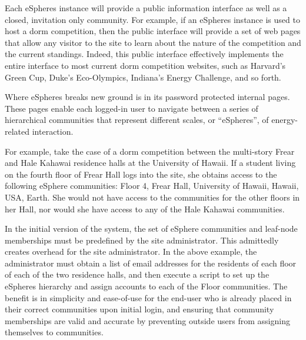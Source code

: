 Each eSpheres instance will provide a public information interface as well
as a closed, invitation only community.  For example, if an eSpheres
instance is used to host a dorm competition, then the public interface will
provide a set of web pages that allow any visitor to the site to learn
about the nature of the competition and the current standings.  Indeed,
this public interface effectively implements the entire interface to most
current dorm competition websites, such as Harvard's Green Cup, Duke's
Eco-Olympics, Indiana's Energy Challenge, and so forth. 

Where eSpheres breaks new ground is in its password protected internal
pages.  These pages enable each logged-in user to navigate between a series
of hierarchical communities that represent different scales, or
``eSpheres'', of energy-related interaction.

For example, take the case of a dorm competition between the multi-story
Frear and Hale Kahawai residence halls at the University of Hawaii. If a
student living on the fourth floor of Frear Hall logs into the site, she
obtains access to the following eSphere communities: Floor 4, Frear Hall, University
of Hawaii, Hawaii, USA, Earth.  She would not have access to the communities for
the other floors in her Hall, nor would she have access to any of the Hale
Kahawai communities.  



In the initial version of the system, the set of eSphere communities and
leaf-node memberships must be predefined by the site administrator. This
admittedly creates overhead for the site administrator. In the above
example, the administrator must obtain a list of email addresses for the residents
of each floor of each of the two residence halls, and then execute a script
to set up the eSpheres hierarchy and assign accounts to each of the Floor
communities. The benefit is in simplicity and ease-of-use for the end-user
who is already placed in their correct communities upon initial login, 
and ensuring that community memberships are valid and accurate by
preventing outside users from assigning themselves to communities.

